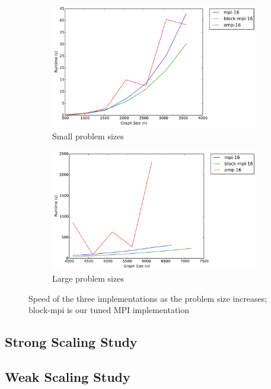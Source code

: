 \documentclass[11pt]{article}
\begin{document}
\begin{figure}[ht]
	\centering
	\begin{subfigure}[b]{.45\textwidth}
		\includegraphics[width=\textwidth]{comparison_small.pdf}
		\caption{Small problem sizes}
	\end{subfigure}
	\begin{subfigure}[b]{.45\textwidth}
		\includegraphics[width=\textwidth]{comparison_large.pdf}
		\caption{Large problem sizes}
	\end{subfigure}
	\caption{Speed of the three implementations as the problem size increases; block-mpi is our tuned MPI implementation}
	\label{fig:size-comparison}
\end{figure}


\subsection{Strong Scaling Study}

\subsection{Weak Scaling Study}
\end{document}
